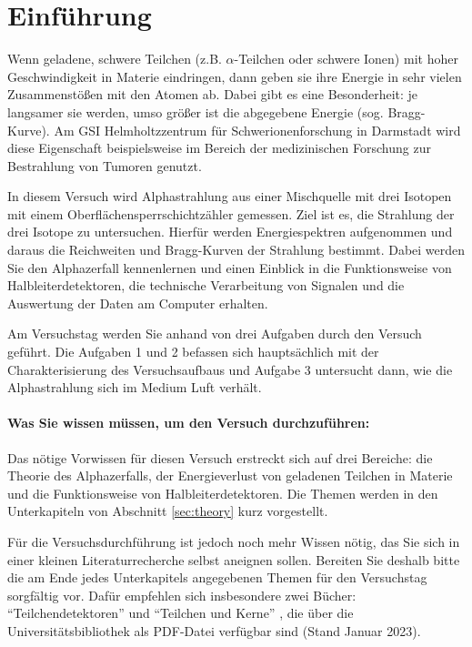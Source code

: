 \section{Einführung}
Wenn geladene, schwere Teilchen (z.B. $\alpha$-Teilchen oder schwere Ionen) mit hoher Geschwindigkeit in Materie eindringen, dann geben sie ihre Energie in sehr vielen Zusammenstößen mit den Atomen ab. Dabei gibt es eine Besonderheit: je langsamer sie werden, umso größer ist die abgegebene Energie (sog. Bragg-Kurve). Am GSI Helmholtzzentrum für Schwerionenforschung in Darmstadt wird diese Eigenschaft beispielsweise im Bereich der medizinischen Forschung zur Bestrahlung von Tumoren genutzt.

In diesem Versuch wird Alphastrahlung aus einer Mischquelle mit drei Isotopen mit einem Oberflächensperrschichtzähler gemessen. Ziel ist es, die Strahlung der drei Isotope zu untersuchen. Hierfür werden Energiespektren aufgenommen und daraus die Reichweiten und Bragg-Kurven der Strahlung bestimmt. Dabei werden Sie den Alphazerfall kennenlernen und einen Einblick in die Funktionsweise von Halbleiterdetektoren, die technische Verarbeitung von Signalen und die Auswertung der Daten am Computer erhalten.

Am Versuchstag werden Sie anhand von drei Aufgaben durch den Versuch geführt. Die Aufgaben 1 und 2 befassen sich hauptsächlich mit der Charakterisierung des Versuchsaufbaus und Aufgabe 3 untersucht dann, wie die Alphastrahlung sich im Medium Luft verhält.

\paragraph*{Was Sie wissen müssen, um den Versuch durchzuführen:}
Das nötige Vorwissen für diesen Versuch erstreckt sich auf drei Bereiche: die Theorie des Alphazerfalls, der Energieverlust von geladenen Teilchen in Materie und die Funktionsweise von Halbleiterdetektoren. Die Themen werden in den Unterkapiteln von Abschnitt \ref{sec:theory} kurz vorgestellt.

Für die Versuchsdurchführung ist jedoch noch mehr Wissen nötig, das Sie sich in einer kleinen Literaturrecherche selbst aneignen sollen. Bereiten Sie deshalb bitte die am Ende jedes Unterkapitels angegebenen Themen für den Versuchstag sorgfältig vor. 
Dafür empfehlen sich insbesondere zwei Bücher: "`Teilchendetektoren"' \cite{kolanoski} und "`Teilchen und Kerne"' \cite{povh-rith}, die über die Universitätsbibliothek als PDF-Datei verfügbar sind (Stand Januar 2023).

